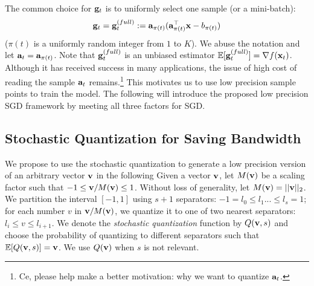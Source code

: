 The common choice for ${\bf g}_t$ is to uniformly select one sample (or a mini-batch):
\begin{align}
{\bf g}_t = {\bf g}_t^{(full)} := {\bf a}_{\pi(t)} ({\bf a}_{\pi(t)}^\top {\bf x} - b_{\pi(t)})
\label{eq:sgfull}
\end{align} 
($\pi(t)$ is a uniformly random integer from $1$ to $K$). We abuse the notation and let ${\bf a}_t = {\bf a}_{\pi(t)}$. Note that ${\bf g}_t^{(full)}$ is an unbiased estimator $\mathbb{E} [{\bf g}_t^{(full)}] = \nabla f({\bf x}_t)$. Although it has received success in many applications, the issue of high cost of reading the sample ${\bf a}_{t}$ remains.\footnote{Ce, please help make a better motivation: why we want to quantize ${\bf a}_t$.} This motivates us to use low precision sample points to train the model. The following will introduce the proposed low precision SGD framework by meeting all three factors for SGD.


\subsection{Stochastic Quantization for Saving Bandwidth} 
We propose to use the stochastic quantization to generate a low precision version of an arbitrary vector ${\bf v}$ in the following 
Given a vector
${\bf v}$, let $M({\bf v})$ be a scaling factor such that $-1 \le {\bf v}/M({\bf v}) \le 1$. Without loss of generality, let $M({\bf v})=||{\bf v}||_2$. We partition the interval $[-1, 1]$ using $s+1$ separators: $-1 = l_0 \le l_1 ... \le l_{s} = 1$; for each number $v$ in ${\bf v}/M({\bf v})$, we 
quantize it to one of two nearest separators: $l_i \le v \le l_{i+1}$. We denote the \emph{stochastic quantization} function by $Q({\bf v}, s)$ and choose the probability of quantizing to different separators such that $\mathbb{E}[Q({\bf v}, s)] = {\bf v}$. We use $Q({\bf v})$ when $s$ is not relevant. 


